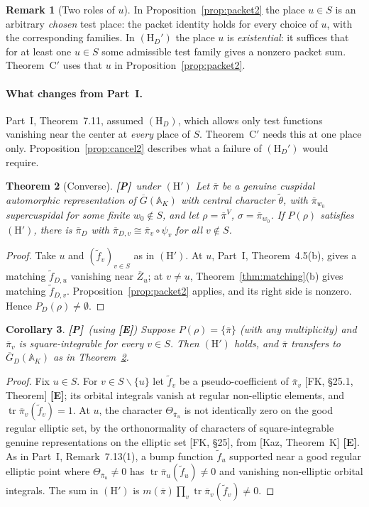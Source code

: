 \documentclass[12pt]{article}
\newcommand{\ov}[1]{\overline{#1}}
\newcommand{\A}{\mathbb{A}}
\newcommand{\tr}{\operatorname{tr}}
\newcommand{\Gb}{\ov{G}}
\newcommand{\Zb}{\ov{Z}}
\newcommand{\GDb}{\ov{G}_D}
\newcommand{\pib}{\ov{\pi}}
\newcommand{\Pv}{\textbf{[P]}}
\newcommand{\Ev}{\textbf{[E]}}
\theoremstyle{plain}
\newtheorem{theorem}{Theorem}[section]
\newtheorem{corollary}[theorem]{Corollary}
\theoremstyle{definition}
\newtheorem{remark}[theorem]{Remark}
\begin{document}
\begin{remark}[Two roles of $u$]
In Proposition~\ref{prop:packet2} the place $u\in S$ is an arbitrary \emph{chosen} test place: the packet identity holds for every choice of $u$, with the corresponding families. In $(\mathrm H_D')$ the place $u$ is \emph{existential}: it suffices that for at least one $u\in S$ some admissible test family gives a nonzero packet sum. Theorem~C$'$ uses that $u$ in Proposition~\ref{prop:packet2}.
\end{remark}

\paragraph{What changes from Part~I.} Part~I, Theorem~7.11, assumed $(\mathrm H_D)$, which allows only test functions vanishing near the center at \emph{every} place of $S$. Theorem~C$'$ needs this at one place only. Proposition~\ref{prop:cancel2} describes what a failure of $(\mathrm H_D')$ would require.

\begin{theorem}[Converse]\label{thm:Cprimeconv}\Pv\ under $(\mathrm H')$
Let $\pib$ be a genuine cuspidal automorphic representation of $\Gb(\A_K)$ with central character $\tilde\theta$, with $\pib_{w_0}$ supercuspidal for some finite $w_0\notin S$, and let $\rho=\pib^V$, $\sigma=\pib_{w_0}$. If $P(\rho)$ satisfies $(\mathrm H')$, there is $\pib_D$ with $\pib_{D,v}\cong\pib_v\circ\psi_v$ for all $v\notin S$.
\end{theorem}
\begin{proof}
Take $u$ and $(\tilde f_v)_{v\in S}$ as in $(\mathrm H')$. At $u$, Part~I, Theorem~4.5(b), gives a matching $\tilde f_{D,u}$ vanishing near $\Zb_u$; at $v\ne u$, Theorem~\ref{thm:matching}(b) gives matching $\tilde f_{D,v}$. Proposition~\ref{prop:packet2} applies, and its right side is nonzero. Hence $P_D(\rho)\ne\emptyset$.
\end{proof}

\begin{corollary}\label{cor:Hprimesq}\Pv\ (using \Ev)
Suppose $P(\rho)=\{\pib\}$ (with any multiplicity) and $\pib_v$ is square-integrable for every $v\in S$. Then $(\mathrm H')$ holds, and $\pib$ transfers to $\GDb(\A_K)$ as in Theorem~\ref{thm:Cprimeconv}.
\end{corollary}
\begin{proof}
Fix $u\in S$. For $v\in S\smallsetminus\{u\}$ let $\tilde f_v$ be a pseudo-coefficient of $\pib_v$ [FK, \S25.1, Theorem] \Ev; its orbital integrals vanish at regular non-elliptic elements, and $\tr\pib_v(\tilde f_v)=1$. At $u$, the character $\Theta_{\pib_u}$ is not identically zero on the good regular elliptic set, by the orthonormality of characters of square-integrable genuine representations on the elliptic set [FK, \S25], from [Kaz, Theorem~K] \Ev. As in Part~I, Remark~7.13(1), a bump function $\tilde f_u$ supported near a good regular elliptic point where $\Theta_{\pib_u}\ne0$ has $\tr\pib_u(\tilde f_u)\ne0$ and vanishing non-elliptic orbital integrals. The sum in $(\mathrm H')$ is $m(\pib)\prod_v\tr\pib_v(\tilde f_v)\ne0$.
\end{proof}
\end{document}
